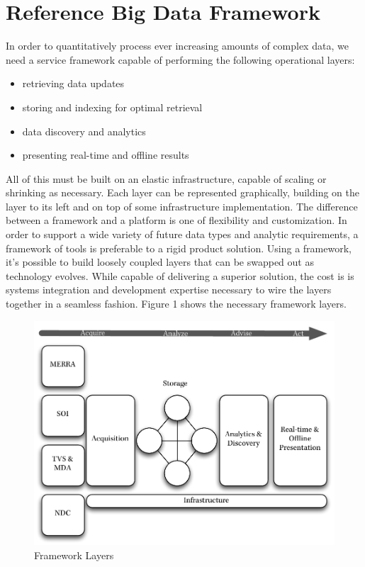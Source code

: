 \section{Reference Big Data Framework}
In order to quantitatively process ever increasing amounts of complex data, we need a service framework capable of performing the following operational layers:
\begin{itemize}
	\item retrieving data updates
	\item storing and indexing for optimal retrieval
	\item data discovery and analytics
	\item presenting real-time and offline results
\end{itemize}
All of this must be built on an elastic infrastructure, capable of scaling or shrinking as necessary. Each layer can be represented graphically, building on the layer to its left and on top of some infrastructure implementation. The difference between a framework and a platform is one of flexibility and customization. In order to support a wide variety of future data types and analytic requirements, a framework of tools is preferable to a rigid product solution. Using a framework, it's possible to build loosely coupled layers that can be swapped out as technology evolves. While capable of delivering a superior solution, the cost is is systems integration and development expertise necessary to wire the layers together in a seamless fashion. Figure 1 shows the necessary framework layers. 
\begin{figure}[htbp]
    \centering
    \caption{Framework Layers}
    \includegraphics[scale=.80]{framework_layers}
\end{figure}
